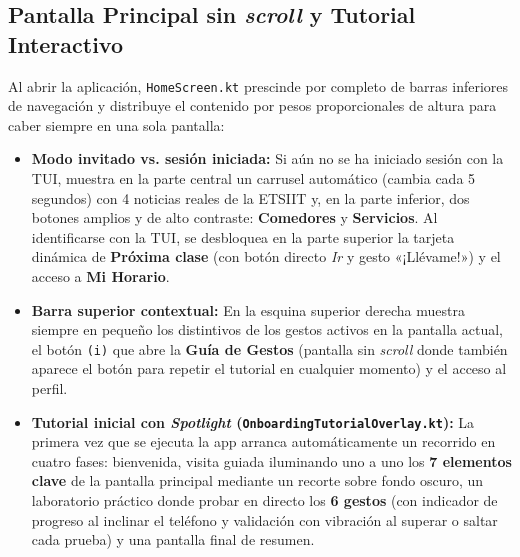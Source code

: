 \documentclass[11pt,a4paper]{article}
\begin{document}
\subsection{Pantalla Principal sin \textit{scroll} y Tutorial Interactivo}
Al abrir la aplicación, \texttt{HomeScreen.kt} prescinde por completo de barras inferiores de navegación y distribuye el contenido por pesos proporcionales de altura para caber siempre en una sola pantalla:
\begin{itemize}[leftmargin=1.8em]
    \item \textbf{Modo invitado vs. sesión iniciada:} Si aún no se ha iniciado sesión con la TUI, muestra en la parte central un carrusel automático (cambia cada 5 segundos) con 4 noticias reales de la ETSIIT y, en la parte inferior, dos botones amplios y de alto contraste: \textbf{Comedores} y \textbf{Servicios}. Al identificarse con la TUI, se desbloquea en la parte superior la tarjeta dinámica de \textbf{Próxima clase} (con botón directo \textit{Ir} y gesto «¡Llévame!») y el acceso a \textbf{Mi Horario}.
    \item \textbf{Barra superior contextual:} En la esquina superior derecha muestra siempre en pequeño los distintivos de los gestos activos en la pantalla actual, el botón \texttt{(i)} que abre la \textbf{Guía de Gestos} (pantalla sin \textit{scroll} donde también aparece el botón para repetir el tutorial en cualquier momento) y el acceso al perfil.
    \item \textbf{Tutorial inicial con \textit{Spotlight} (\texttt{OnboardingTutorialOverlay.kt}):} La primera vez que se ejecuta la app arranca automáticamente un recorrido en cuatro fases: bienvenida, visita guiada iluminando uno a uno los \textbf{7 elementos clave} de la pantalla principal mediante un recorte sobre fondo oscuro, un laboratorio práctico donde probar en directo los \textbf{6 gestos} (con indicador de progreso al inclinar el teléfono y validación con vibración al superar o saltar cada prueba) y una pantalla final de resumen.
\end{itemize}
\end{document}
